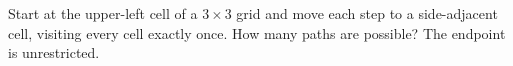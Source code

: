 Start at the upper-left cell of a $3\times3$ grid and move each step to a side-adjacent cell, visiting every cell exactly once. How many paths are possible? The endpoint is unrestricted.
